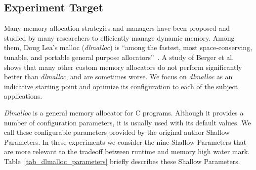 \subsection{Experiment Target}



Many memory allocation strategies and managers have been proposed and studied by many researchers to efficiently manage dynamic memory. Among them, Doug Lea's malloc (\emph{dlmalloc}) is ``among the fastest, most space-conserving, tunable, and portable general purpose allocators''~\cite{lea1996memory}. A study of Berger et al.~\cite{Berger:2002:RCM:582419.582421} shows that many other custom memory allocators do not perform significantly better than \emph{dlmalloc}, and are sometimes worse. We focus on \emph{dlmalloc} as an indicative starting point and optimize its configuration to each of the subject applications.

\emph{Dlmalloc} is a general memory allocator for C
programs. Although it provides a number of configuration parameters,  
it is usually used with its default values. 
We call these configurable parameters provided by the original author
Shallow Parameters. In these experiments we consider the nine Shallow
Parameters that are more relevant to the tradeoff between runtime and
memory high water mark. Table~\ref{tab_dlmalloc_parameters} briefly
describes these Shallow Parameters. 

